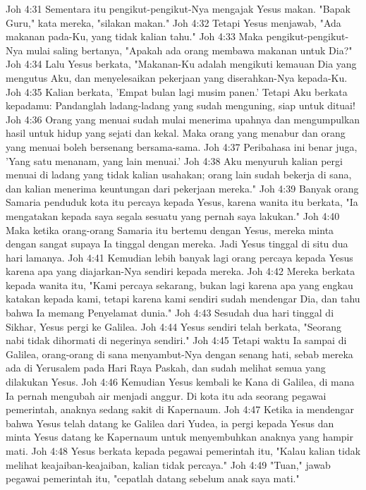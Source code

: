 Joh 4:31  Sementara itu pengikut-pengikut-Nya mengajak Yesus makan. "Bapak Guru," kata mereka, "silakan makan."
Joh 4:32  Tetapi Yesus menjawab, "Ada makanan pada-Ku, yang tidak kalian tahu."
Joh 4:33  Maka pengikut-pengikut-Nya mulai saling bertanya, "Apakah ada orang membawa makanan untuk Dia?"
Joh 4:34  Lalu Yesus berkata, "Makanan-Ku adalah mengikuti kemauan Dia yang mengutus Aku, dan menyelesaikan pekerjaan yang diserahkan-Nya kepada-Ku.
Joh 4:35  Kalian berkata, 'Empat bulan lagi musim panen.' Tetapi Aku berkata kepadamu: Pandanglah ladang-ladang yang sudah menguning, siap untuk dituai!
Joh 4:36  Orang yang menuai sudah mulai menerima upahnya dan mengumpulkan hasil untuk hidup yang sejati dan kekal. Maka orang yang menabur dan orang yang menuai boleh bersenang bersama-sama.
Joh 4:37  Peribahasa ini benar juga, 'Yang satu menanam, yang lain menuai.'
Joh 4:38  Aku menyuruh kalian pergi menuai di ladang yang tidak kalian usahakan; orang lain sudah bekerja di sana, dan kalian menerima keuntungan dari pekerjaan mereka."
Joh 4:39  Banyak orang Samaria penduduk kota itu percaya kepada Yesus, karena wanita itu berkata, "Ia mengatakan kepada saya segala sesuatu yang pernah saya lakukan."
Joh 4:40  Maka ketika orang-orang Samaria itu bertemu dengan Yesus, mereka minta dengan sangat supaya Ia tinggal dengan mereka. Jadi Yesus tinggal di situ dua hari lamanya.
Joh 4:41  Kemudian lebih banyak lagi orang percaya kepada Yesus karena apa yang diajarkan-Nya sendiri kepada mereka.
Joh 4:42  Mereka berkata kepada wanita itu, "Kami percaya sekarang, bukan lagi karena apa yang engkau katakan kepada kami, tetapi karena kami sendiri sudah mendengar Dia, dan tahu bahwa Ia memang Penyelamat dunia."
Joh 4:43  Sesudah dua hari tinggal di Sikhar, Yesus pergi ke Galilea.
Joh 4:44  Yesus sendiri telah berkata, "Seorang nabi tidak dihormati di negerinya sendiri."
Joh 4:45  Tetapi waktu Ia sampai di Galilea, orang-orang di sana menyambut-Nya dengan senang hati, sebab mereka ada di Yerusalem pada Hari Raya Paskah, dan sudah melihat semua yang dilakukan Yesus.
Joh 4:46  Kemudian Yesus kembali ke Kana di Galilea, di mana Ia pernah mengubah air menjadi anggur. Di kota itu ada seorang pegawai pemerintah, anaknya sedang sakit di Kapernaum.
Joh 4:47  Ketika ia mendengar bahwa Yesus telah datang ke Galilea dari Yudea, ia pergi kepada Yesus dan minta Yesus datang ke Kapernaum untuk menyembuhkan anaknya yang hampir mati.
Joh 4:48  Yesus berkata kepada pegawai pemerintah itu, "Kalau kalian tidak melihat keajaiban-keajaiban, kalian tidak percaya."
Joh 4:49  "Tuan," jawab pegawai pemerintah itu, "cepatlah datang sebelum anak saya mati."
